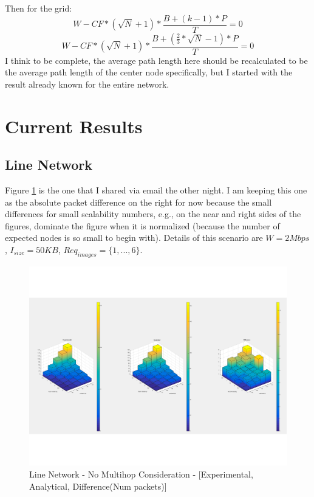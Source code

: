 \documentclass[conference]{IEEEtran}
\begin{document}
Then for the grid:
\begin{equation}
	W - CF*(\sqrt{N}+1)*\frac{B+ (k-1)*P}{T} = 0
\end{equation}
\begin{equation}
	W - CF*(\sqrt{N}+1)*\frac{B+ (\frac{2}{3}*\sqrt{N}-1)*P}{T} = 0
\end{equation}
I think to be complete, the average path length here should be recalculated to be the average path length of the center node specifically, but I started with the result already known for the entire network.


\section{Current Results}
\subsection{Line Network}
Figure \ref{fig:line_net_uni_no_mhop} is the one that I shared via email the other night.  I am keeping this one as the absolute packet difference on the right for now because the small differences for small scalability numbers, e.g., on the near and right sides of the figures, dominate the figure when it is normalized (because the number of expected nodes is so small to begin with).  Details of this scenario are $W = 2 Mbps$, $I_{size} = 50 KB$, $Req_{images} = \{1, ..., 6\}$.

\begin{figure}
    \includegraphics[scale=0.65]{result_expl_figs/line_unicast_large_buffers.pdf}
    \caption{Line Network - No Multihop Consideration - [Experimental, Analytical, Difference(Num packets)]}
    \label{fig:line_net_uni_no_mhop}
\end{figure}
\end{document}

